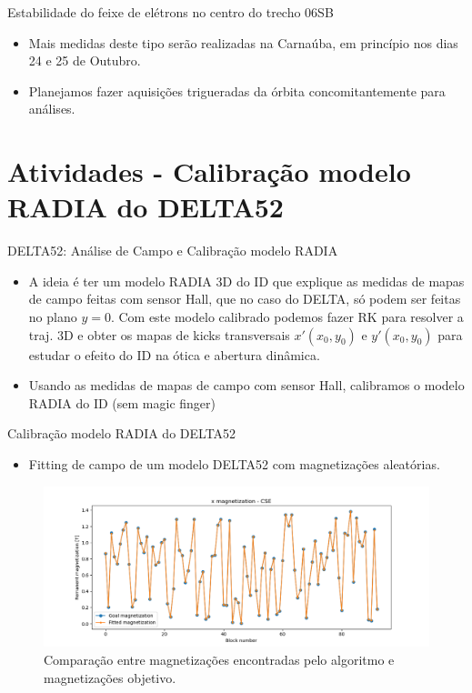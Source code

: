 \documentclass{beamer}					%
\begin{document}
\begin{frame}{Estabilidade do feixe de elétrons no centro do trecho 06SB}
    
    \begin{itemize}
		\item Mais medidas deste tipo serão realizadas na Carnaúba, em princípio nos dias 24 e 25 de Outubro. 
        \item Planejamos fazer aquisições trigueradas da órbita concomitantemente para análises.
	\end{itemize}
    
\end{frame}



\section{Atividades - Calibração modelo RADIA do DELTA52}

\begin{frame}{DELTA52: Análise de Campo e Calibração modelo RADIA}
    \begin{itemize}
		\item A ideia é ter um modelo RADIA 3D do ID que explique as medidas de mapas de campo feitas com sensor Hall, que no caso do DELTA, só podem ser feitas no plano $y = 0$. Com este modelo calibrado podemos fazer RK para resolver a traj. 3D e obter os mapas de kicks transversais $x'(x_0, y_0)$ e $y'(x_0, y_0)$ para estudar o efeito do ID na ótica e abertura dinâmica.
        \item Usando as medidas de mapas de campo com sensor Hall, calibramos o modelo RADIA do ID (sem magic finger)
	\end{itemize}
\end{frame}
\begin{frame}{Calibração modelo RADIA do DELTA52}
\begin{itemize}
        \item Fitting de campo de um modelo DELTA52 com magnetizações aleatórias.
	\end{itemize}
\begin{figure}[H]
		\centering
        \includegraphics[width=.9\textwidth]{figures/mag_fitting.png}
        \caption{Comparação entre magnetizações encontradas pelo algoritmo e magnetizações objetivo.}
        \label{fig:mag_fitting}
    \end{figure}
\end{frame}
\end{document}
